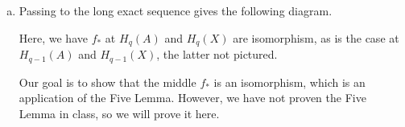 \documentclass[10pt]{mypackage}
\begin{document}
\begin{solution}\hfill
  \begin{enumerate}[(a)]
    \item Passing to the long exact sequence gives the following diagram.
      \begin{center}
      \end{center}
      Here, we have $f_{\ast}$ at $H_q(A)$ and $H_{q}(X)$ are isomorphism, as is the case at $H_{q-1}\left( A \right)$ and $H_{q-1}\left( X \right)$, the latter not pictured.

      Our goal is to show that the middle $f_{\ast}$ is an isomorphism, which is an application of the Five Lemma. However, we have not proven the Five Lemma in class, so we will prove it here.


\end{enumerate}
\end{solution}
\end{document}
